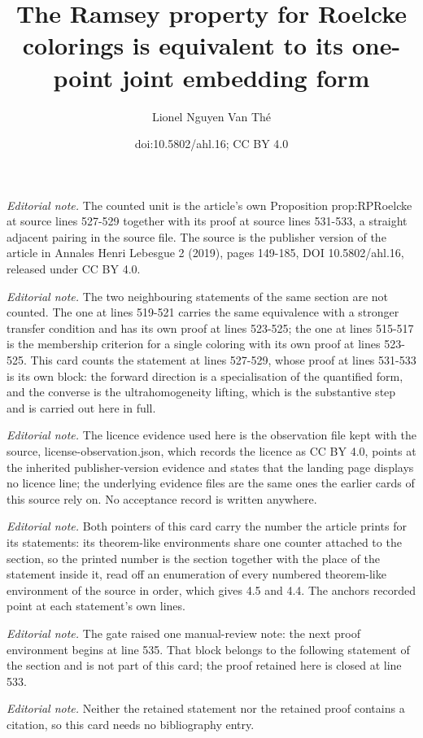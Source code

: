 \documentclass[10pt,a4paper]{article}
\title{The Ramsey property for Roelcke colorings is equivalent to its one-point joint embedding form}
\author{Lionel Nguyen Van Thé}
\date{doi:10.5802/ahl.16; CC BY 4.0}
\theoremstyle{definition}
\numberwithin{equation}{section}
\numberwithin{figure}{section}
\numberwithin{table}{section}
\begin{document}
\maketitle
\noindent\textit{Editorial note.} The counted unit is the article's own Proposition prop:RPRoelcke at source lines 527-529 together with its proof at source lines 531-533, a straight adjacent pairing in the source file. The source is the publisher version of the article in Annales Henri Lebesgue 2 (2019), pages 149-185, DOI 10.5802/ahl.16, released under CC BY 4.0.\par\medskip
\noindent\textit{Editorial note.} The two neighbouring statements of the same section are not counted. The one at lines 519-521 carries the same equivalence with a stronger transfer condition and has its own proof at lines 523-525; the one at lines 515-517 is the membership criterion for a single coloring with its own proof at lines 523-525. This card counts the statement at lines 527-529, whose proof at lines 531-533 is its own block: the forward direction is a specialisation of the quantified form, and the converse is the ultrahomogeneity lifting, which is the substantive step and is carried out here in full.\par\medskip
\noindent\textit{Editorial note.} The licence evidence used here is the observation file kept with the source, license-observation.json, which records the licence as CC BY 4.0, points at the inherited publisher-version evidence and states that the landing page displays no licence line; the underlying evidence files are the same ones the earlier cards of this source rely on. No acceptance record is written anywhere.\par\medskip
\noindent\textit{Editorial note.} Both pointers of this card carry the number the article prints for its statements: its theorem-like environments share one counter attached to the section, so the printed number is the section together with the place of the statement inside it, read off an enumeration of every numbered theorem-like environment of the source in order, which gives 4.5 and 4.4. The anchors recorded point at each statement's own lines.\par\medskip
\noindent\textit{Editorial note.} The gate raised one manual-review note: the next proof environment begins at line 535. That block belongs to the following statement of the section and is not part of this card; the proof retained here is closed at line 533.\par\medskip
\noindent\textit{Editorial note.} Neither the retained statement nor the retained proof contains a citation, so this card needs no bibliography entry.\par\medskip
\end{document}
